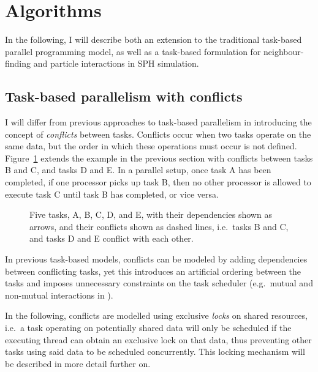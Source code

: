 \documentclass[final]{siamltex}
\newcommand{\fig}[1]
    {Figure~\ref{fig:#1}}
\begin{document}
\section{Algorithms}

In the following, I will describe both an extension to the
traditional task-based parallel programming model, as well
as a task-based formulation for neighbour-finding and 
particle interactions in SPH simulation.


\subsection{Task-based parallelism with conflicts}

I will differ from previous approaches to task-based parallelism
in introducing the concept of {\em conflicts} between tasks.
Conflicts occur when two tasks operate on the same data, 
but the order in which these operations must occur is not defined.
\fig{TasksExampleConflicts} extends the example in the
previous section with conflicts between tasks B and C, and tasks D and E.
In a parallel setup, once task A has been completed, if one processor
picks up task B, then no other processor is allowed to execute
task C until task B has completed, or vice versa.

\begin{figure}
    \centerline{}
    
    \caption{Five tasks, A, B, C, D, and E, with their dependencies
        shown as arrows, and their conflicts shown as dashed lines,
        i.e.~tasks B and C, and tasks D and E conflict with each
        other.}
    \label{fig:TasksExampleConflicts}
\end{figure}

In previous task-based models, conflicts can be modeled by adding
dependencies between conflicting tasks,
yet this introduces an artificial ordering between the tasks
and imposes unnecessary constraints on the task scheduler
(e.g.~mutual and non-mutual interactions in \cite{ref:Ltaief2012}).

In the following, conflicts are modelled using exclusive {\em locks} on shared
resources, i.e.~a task operating on potentially shared data will
only be scheduled if the executing thread can obtain an exclusive
lock on that data,
thus preventing other tasks using said data to be scheduled concurrently.
This locking mechanism will be described in more detail further on.
\end{document}

